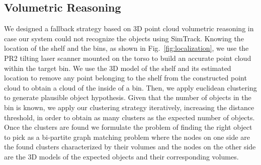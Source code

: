 \subsection{Volumetric Reasoning}

We designed a fallback strategy based on 3D point cloud volumetric reasoning in case our system could not recognize the objects using SimTrack. Knowing the location of the shelf and the bins, as shown in Fig.~\ref{fig:localization}, we use the PR2 tilting laser scanner mounted on the torso to build an accurate point cloud within the target bin. We use the 3D model of the shelf and its estimated location to remove any point belonging to the shelf from the constructed point cloud to obtain a cloud of the inside of a bin. Then, we  apply euclidean clustering to generate plausible object hypothesis. Given that the number of objects in the bin is known, we apply our clustering strategy iteratively, increasing the distance threshold, in order to obtain as many clusters as the expected number of objects. Once the clusters are found we formulate the problem of finding the right object to pick as a bi-partite graph matching problem where the nodes on one side are the found clusters characterized by their volumes and the nodes on the other side are the 3D models of the expected objects and their corresponding volumes.